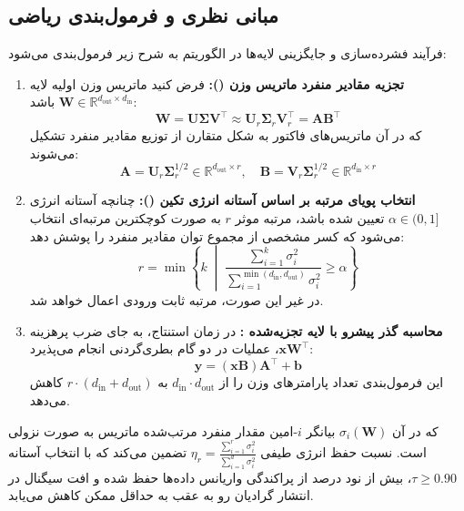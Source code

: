 \subsection{مبانی نظری و فرمول‌بندی ریاضی}
فرآیند فشرده‌سازی و جایگزینی لایه‌ها در الگوریتم  به شرح زیر فرمول‌بندی می‌شود:
\begin{enumerate}
    \item \textbf{تجزیه مقادیر منفرد ماتریس وزن ():}
    فرض کنید ماتریس وزن اولیه لایه $\mathbf{W} \in \mathbb{R}^{d_{\text{out}} \times d_{\text{in}}}$ باشد:
    \begin{equation}
    \mathbf{W} = \mathbf{U} \boldsymbol{\Sigma} \mathbf{V}^\top \approx \mathbf{U}_r \boldsymbol{\Sigma}_r \mathbf{V}_r^\top = \mathbf{A} \mathbf{B}^\top
    \end{equation}
    که در آن ماتریس‌های فاکتور به شکل متقارن از توزیع مقادیر منفرد تشکیل می‌شوند:
    \begin{equation}
    \mathbf{A} = \mathbf{U}_r \boldsymbol{\Sigma}_r^{1/2} \in \mathbb{R}^{d_{\text{out}} \times r}, \quad \mathbf{B} = \mathbf{V}_r \boldsymbol{\Sigma}_r^{1/2} \in \mathbb{R}^{d_{\text{in}} \times r}
    \end{equation}
    \item \textbf{انتخاب پویای مرتبه بر اساس آستانه انرژی تکین ():}
    چنانچه آستانه انرژی $\alpha \in (0, 1]$ تعیین شده باشد، مرتبه موثر $r$ به صورت کوچکترین مرتبه‌ای انتخاب می‌شود که کسر مشخصی از مجموع توان مقادیر منفرد را پوشش دهد:
    \begin{equation}
    r = \min \left\{ k \;\middle|\; \frac{\sum_{i=1}^k \sigma_i^2}{\sum_{i=1}^{\min(d_{\text{in}}, d_{\text{out}})} \sigma_i^2} \ge \alpha \right\}
    \end{equation}
    در غیر این صورت، مرتبه ثابت ورودی اعمال خواهد شد.
    \item \textbf{محاسبه گذر پیشرو با لایه تجزیه‌شده :}
    در زمان استنتاج، به جای ضرب پرهزینه $\mathbf{x} \mathbf{W}^\top$، عملیات در دو گام بطری‌گردنی انجام می‌پذیرد:
    \begin{equation}
    \mathbf{y} = (\mathbf{x} \mathbf{B}) \mathbf{A}^\top + \mathbf{b}
    \end{equation}
    این فرمول‌بندی تعداد پارامترهای وزن را از $d_{\text{in}} \cdot d_{\text{out}}$ به $r \cdot (d_{\text{in}} + d_{\text{out}})$ کاهش می‌دهد.
\end{enumerate}

که در آن $\sigma_i(\mathbf{W})$ بیانگر $i$-امین مقدار منفرد مرتب‌شده ماتریس به صورت نزولی است. نسبت حفظ انرژی طیفی $\eta_r = \frac{\sum_{i=1}^r \sigma_i^2}{\sum_{i=1}^{d} \sigma_i^2}$ تضمین می‌کند که با انتخاب آستانه $\tau \ge 0.90$، بیش از نود درصد از پراکندگی واریانس داده‌ها حفظ شده و افت سیگنال در انتشار گرادیان رو به عقب به حداقل ممکن کاهش می‌یابد.

